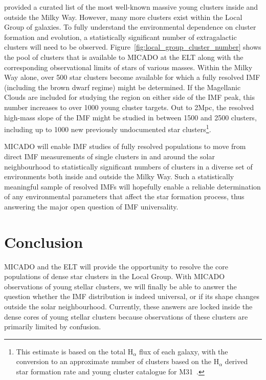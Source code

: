 \documentclass[referee]{aa}
\begin{document}
\citet{portegies2010} provided a curated list of the most well-known massive young clusters inside and outside the Milky Way.
However, many more clusters exist within the Local Group of galaxies.
To fully understand the environmental dependence on cluster formation and evolution, a statistically significant number of extragalactic clusters will need to be observed.
Figure~\ref{fig:local_group_cluster_number} shows the pool of clusters that is available to MICADO at the ELT along with the corresponding observational limits of stars of various masses.
Within the Milky Way alone, over 500 star clusters become available for which a fully resolved IMF (including the brown dwarf regime) might be determined.
If the Magellanic Clouds are included for studying the region on either side of the IMF peak, this number increases to over 1000 young cluster targets.
Out to 2Mpc, the resolved high-mass slope of the IMF might be studied in between 1500 and 2500 clusters, including up to 1000 new previously undocumented star clusters\footnote{This estimate is based on the total H$_\alpha$ flux of each galaxy, with the conversion to an approximate number of clusters based on the H$_\alpha$ derived star formation rate and young cluster catalogue for M31~\citep{caldwell09}.}.

MICADO will enable IMF studies of fully resolved populations to move from direct IMF measurements of single clusters in and around the solar neighbourhood to statistically significant numbers of clusters in a diverse set of environments both inside and outside the Milky Way.
Such a statistically meaningful sample of resolved IMFs will hopefully enable a reliable determination of any environmental parameters that affect the star formation process, thus answering the major open question of IMF universality.




\section{Conclusion}
\label{sec:conclusion}

MICADO and the ELT will provide the opportunity to resolve the core populations of dense star clusters in the Local Group.
With MICADO observations of young stellar clusters, we will finally be able to answer the question whether the IMF distribution is indeed universal, or if its shape changes outside the solar neighbourhood.
Currently, these answers are locked inside the dense cores of young stellar clusters because observations of these clusters are primarily limited by confusion.
\end{document}

